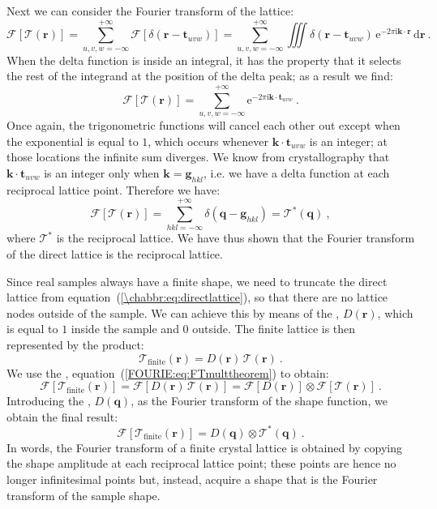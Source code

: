 Next we can consider the Fourier transform of the lattice:
\[
	\mathcal{F}[\mathcal{T}(\mathbf{r})]=\sum_{u,v,w=-\infty}^{+\infty} \mathcal{F}[\delta(\mathbf{r}-\mathbf{t}_{uvw})]=\sum_{u,v,w=-\infty}^{+\infty} \iiint \delta(\mathbf{r}-\mathbf{t}_{uvw})\, \mathrm{e}^{-2\pi\mathrm{i}\mathbf{k}\cdot\mathbf{r}}\,\mathrm{d}\mathbf{r}\ .
\]
When the delta function is inside an integral, it has the property that it selects the rest of the integrand at the position of the delta peak; as a result we find:
\[
	\mathcal{F}[\mathcal{T}(\mathbf{r})]=\sum_{u,v,w=-\infty}^{+\infty} \mathrm{e}^{-2\pi\mathrm{i}\mathbf{k}\cdot\mathbf{t}_{uvw}}\ .
\]	
Once again, the trigonometric functions will cancel each other out except when the exponential is equal to $1$, which occurs whenever $\mathbf{k}\cdot\mathbf{t}_{uvw}$ is an integer; at those locations the infinite sum diverges.  We know from crystallography that $\mathbf{k}\cdot\mathbf{t}_{uvw}$ is an integer only when $\mathbf{k}=\mathbf{g}_{hkl}$, i.e. we have a delta function at each reciprocal lattice point.  Therefore we have:
\begin{equation}
	\mathcal{F}[\mathcal{T}(\mathbf{r})]=\sum_{hkl=-\infty}^{+\infty}\delta(\mathbf{q}-\mathbf{g}_{hkl})=\mathcal{T}^{\ast}(\mathbf{q})\ ,\label{\chabbr:eq:recipdelta}
\end{equation}
where $\mathcal{T}^{\ast}$ is the reciprocal lattice.  We have thus shown that the Fourier transform of the direct lattice is the reciprocal lattice.  

Since real samples always have a finite shape, we need to truncate the direct lattice from equation~(\ref{\chabbr:eq:directlattice}), so that there are no lattice nodes outside of the sample. We can achieve this by means of the , $D(\mathbf{r})$, which is equal to $1$ inside the sample and $0$ outside.  The finite lattice is then represented by the product:
\begin{equation}
	\mathcal{T}_{\text{finite}}(\mathbf{r})=D(\mathbf{r})\,\mathcal{T}(\mathbf{r})\ .\label{\chabbr:eq:finitelattice}
\end{equation}
We use the , equation~(\ref{FOURIE:eq:FTmulttheorem}) to obtain:
\[
	\mathcal{F}[\mathcal{T}_{\text{finite}}(\mathbf{r})]=\mathcal{F}[D(\mathbf{r})\,\mathcal{T}(\mathbf{r})]=\mathcal{F}[D(\mathbf{r})]\otimes\mathcal{F}[\mathcal{T}(\mathbf{r})]\ .
\]
Introducing the , $D(\mathbf{q})$, as the Fourier transform of the shape function, we obtain the final result:
\begin{equation}
	\mathcal{F}[\mathcal{T}_{\text{finite}}(\mathbf{r})]=D(\mathbf{q})\otimes\mathcal{T}^{\ast}(\mathbf{q})\ .\label{\chabbr:eq:finiteFT}
\end{equation}
In words, the Fourier transform of a finite crystal lattice is obtained by copying the shape amplitude at each reciprocal lattice point; these points are hence no longer infinitesimal points but, instead, acquire a shape that is the Fourier transform of the sample shape.





